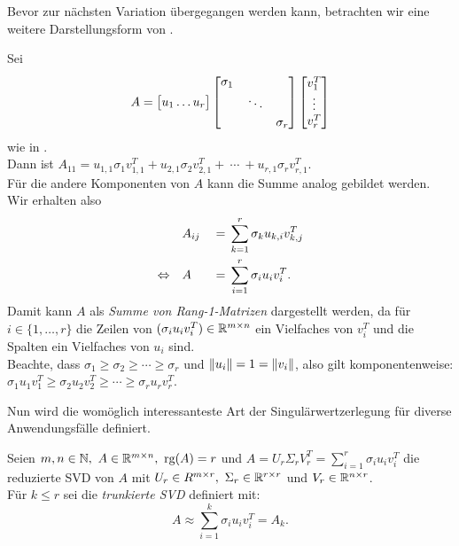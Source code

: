Bevor zur nächsten Variation übergegangen werden kann, betrachten wir eine weitere Darstellungsform von .
\begin{remark}\label{rem:onesvd}
    Sei
    \begin{equation*}
        A = 
        \big[
            \begin{matrix}
                u_1 \dots u_{r}
            \end{matrix}
        \big]
        \begin{bmatrix}
            \sigma_1 &  & \\
            &  \rotatebox{12}{\(\ddots\)} &  \\
            &  &  \sigma_r \\
        \end{bmatrix}
        \begin{bmatrix}
            v^{T}_1 \\
            \vdots \\
            v^{T}_r \\
        \end{bmatrix}
    \end{equation*}
    wie in . \\
    Dann ist \(A_{11} = u_{1,1} \sigma_1 v^{T}_{1,1} + u_{2,1} \sigma_2 v^{T}_{2,1} +\ \cdots \ + u_{r,1} \sigma_r v^{T}_{r,1} \). \\
    Für die andere Komponenten von \(A\) kann die Summe analog gebildet werden. 
    Wir erhalten also
    \begin{alignat*}{2}
        &A_{ij} &{}={}& \sum_{k=1}^{r} \sigma_k u_{k,i} v^{T}_{k,j}  \\
        \Leftrightarrow \quad &A &{}={}& \sum_{i=1}^{r} \sigma_i u_i v^{T}_i.
    \end{alignat*}
    Damit kann \(A\) als \textit{Summe von Rang-\num{1}-Matrizen} dargestellt werden, da für \(i \in \{1,\ldots,r\}\) die Zeilen von \((\sigma_i u_i v^{T}_i)\in \mathbb{R}^{m \times n}\) ein Vielfaches von \(v^{T}_i\) und die Spalten ein Vielfaches von \(u_i\) sind. \\
    Beachte, dass \(\sigma_1 \geq \sigma_2 \geq \cdots \geq \sigma_r\) und \(\lVert u_i\rVert=1=\lVert v_i\rVert\), also gilt komponentenweise: \(\sigma_1 u_1 v^{T}_1 \geq \sigma_2 u_2 v^{T}_2 \geq \cdots \geq \sigma_r u_r v^{T}_r\). 
\end{remark}
Nun wird die womöglich interessanteste Art der Singulärwertzerlegung für diverse Anwendungsfälle definiert.
\begin{definition}\label{df:trunsvd}
    Seien \(m,n \in \N,\ A \in \R^{m \times n},\ \text{rg}(A)=r\) und \(A=U_r \Sigma_r V^{T}_r = \sum_{i=1}^{r} \sigma_i u_i v^{T}_i\) die reduzierte SVD von \(A\) mit \(U_r \in R^{m \times r},\ \Sigma_r \in \mathbb{R}^{r \times r}\) und \(V_r \in \mathbb{R}^{n \times r}\). \\
    Für \(k \leq r\) sei die \textit{trunkierte SVD} definiert mit:
    \begin{equation*}
        A \approx \sum_{i=1}^{k} \sigma_i u_i v^{T}_i = A_k.
    \end{equation*}
\end{definition}
